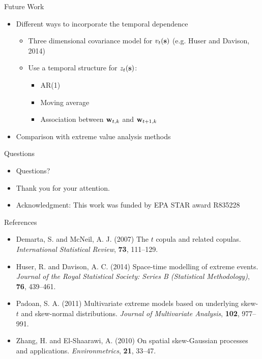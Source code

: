 \documentclass{beamer}
\begin{document}
\begin{frame}{Future Work}
  \begin{itemize} \setlength{\itemsep}{0.5em}
    \item Different ways to incorporate the temporal dependence
    \begin{itemize}
    	\item Three dimensional covariance model for $v_t(\mbox{\bf s})$ (e.g. Huser and Davison, 2014)
    	\item Use a temporal structure for $z_t(\mbox{\bf s})$:
	\begin{itemize}
		\item AR(1)
		\item Moving average
		\item Association between $\mbox{\bf w}_{t, k}$ and $\mbox{\bf w}_{t+1, k}$
	\end{itemize}
    \end{itemize}
     \item Comparison with extreme value analysis methods
  \end{itemize}
\end{frame}

\begin{frame}{Questions}
  \begin{itemize} \setlength{\itemsep}{0.5em}
    \item Questions?
    \item Thank you for your attention.
    \item Acknowledgment: This work was funded by EPA STAR award R835228
  \end{itemize}
\end{frame}

\begin{frame}{References}
  \begin{itemize} \setlength{\itemsep}{0.5em}
    \item Demarta, S. and McNeil, A. J. (2007) The $t$ copula and related copulas. {\it International Statistical Review}, {\bf 73}, 111--129.
    \item Huser, R. and Davison, A. C. (2014) Space-time modelling of extreme events. {\it Journal of the Royal Statistical Society: Series B (Statistical Methodology)}, {\bf 76}, 439--461.
    \item Padoan, S. A. (2011) Multivariate extreme models based on underlying skew-$t$ and skew-normal distributions. {\it Journal of Multivariate Analysis}, {\bf 102}, 977--991.
    \item Zhang, H. and El-Shaarawi, A. (2010) On spatial skew-Gaussian processes and applications. {\it Environmetrics}, {\bf 21}, 33--47.
  \end{itemize}
\end{frame}
\end{document}
